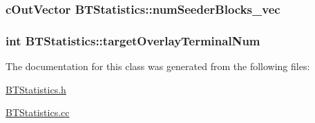 \subsubsection[{num\+Seeder\+Blocks\+\_\+vec}]{\setlength{\rightskip}{0pt plus 5cm}c\+Out\+Vector B\+T\+Statistics\+::num\+Seeder\+Blocks\+\_\+vec\hspace{0.3cm}{\ttfamily [protected]}}\label{classBTStatistics_a6ff3cdec7cc91846c2482ebf1a1ebfe6}
\hypertarget{classBTStatistics_a85c632cdb7b255da257b65e5370000b4}{}
\subsubsection[{target\+Overlay\+Terminal\+Num}]{\setlength{\rightskip}{0pt plus 5cm}int B\+T\+Statistics\+::target\+Overlay\+Terminal\+Num\hspace{0.3cm}{\ttfamily [protected]}}\label{classBTStatistics_a85c632cdb7b255da257b65e5370000b4}


The documentation for this class was generated from the following files\+:\begin{DoxyCompactItemize}
\item 
\hyperlink{BTStatistics_8h}{B\+T\+Statistics.\+h}\item 
\hyperlink{BTStatistics_8cc}{B\+T\+Statistics.\+cc}\end{DoxyCompactItemize}
